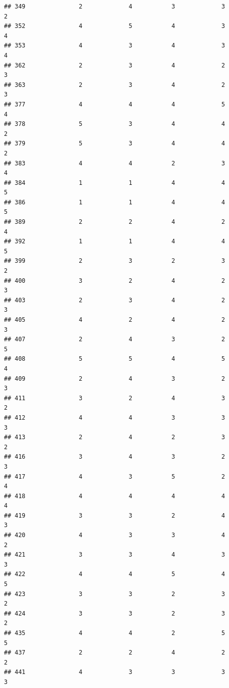 \documentclass[
]{article}
\begin{document}
\begin{verbatim}
## 349               2             4           3             3            2
## 352               4             5           4             3            4
## 353               4             3           4             3            4
## 362               2             3           4             2            3
## 363               2             3           4             2            3
## 377               4             4           4             5            4
## 378               5             3           4             4            2
## 379               5             3           4             4            2
## 383               4             4           2             3            4
## 384               1             1           4             4            5
## 386               1             1           4             4            5
## 389               2             2           4             2            4
## 392               1             1           4             4            5
## 399               2             3           2             3            2
## 400               3             2           4             2            3
## 403               2             3           4             2            3
## 405               4             2           4             2            3
## 407               2             4           3             2            5
## 408               5             5           4             5            4
## 409               2             4           3             2            3
## 411               3             2           4             3            2
## 412               4             4           3             3            3
## 413               2             4           2             3            2
## 416               3             4           3             2            3
## 417               4             3           5             2            4
## 418               4             4           4             4            4
## 419               3             3           2             4            3
## 420               4             3           3             4            2
## 421               3             3           4             3            3
## 422               4             4           5             4            5
## 423               3             3           2             3            2
## 424               3             3           2             3            2
## 435               4             4           2             5            5
## 437               2             2           4             2            2
## 441               4             3           3             3            3

\end{verbatim}
\end{document}

